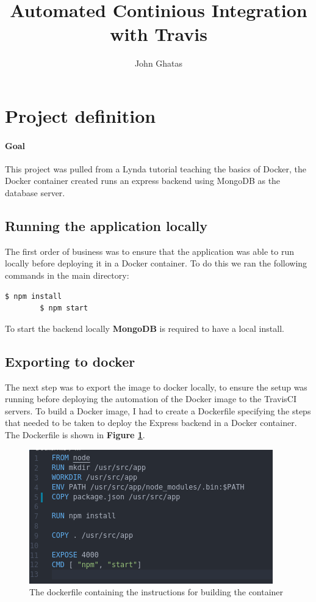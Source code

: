 \documentclass{article}
\title{Automated Continious Integration with Travis}
\date{\displaydate{date}}
\author{John Ghatas}
\begin{document}
    \maketitle
    \newpage
    
    \tableofcontents
    \newpage

    \section{Project definition}
    \paragraph{Goal}{This project was pulled from a Lynda tutorial teaching the basics of Docker, 
    the Docker container created runs an express backend using MongoDB as the database server.}

    \subsection{Running the application locally}{The first order of business was to ensure that the application
    was able to run locally before deploying it in a Docker container. To do this we ran the following commands in
    the main directory:
    \begin{lstlisting}[language=bash]
        $ npm install
        $ npm start
    \end{lstlisting}
    To start the backend locally \textbf{MongoDB} is required to have a local install.
    }

    \subsection{Exporting to docker}{The next step was to export the image to docker locally, to ensure the setup was
    running before deploying the automation of the Docker image to the TravisCI servers. To build a Docker image, I had to create
    a Dockerfile specifying the steps that needed to be taken to deploy the Express backend in a Docker container. The Dockerfile
    is shown in \textbf{Figure \ref{fig:dockerfile}}.}
    
    \begin{figure}[H]
        \centering
        \includegraphics[scale=3, pagebox=artbox]{Images/Dockerfile.png}
        \caption{The dockerfile containing the instructions for building the container}
        \label{fig:dockerfile}
    \end{figure}
\end{document}
